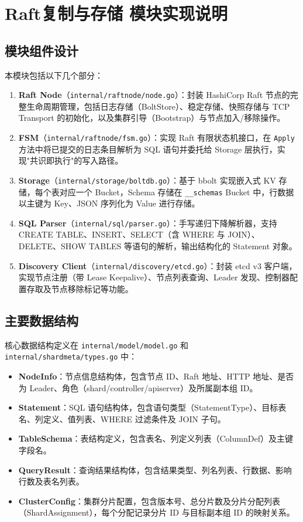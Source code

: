 \documentclass[UTF8,a4paper,12pt]{ctexart}
\newcommand{\moduleA}{Raft复制与存储}
\begin{document}
\section{\moduleA{} 模块实现说明}
\subsection{模块组件设计}
本模块包括以下几个部分：
\begin{enumerate}
  \item \textbf{Raft Node}（\texttt{internal/raftnode/node.go}）：封装 HashiCorp Raft 节点的完整生命周期管理，包括日志存储（BoltStore）、稳定存储、快照存储与 TCP Transport 的初始化，以及集群引导（Bootstrap）与节点加入/移除操作。
  \item \textbf{FSM}（\texttt{internal/raftnode/fsm.go}）：实现 Raft 有限状态机接口，在 \texttt{Apply} 方法中将已提交的日志条目解析为 SQL 语句并委托给 Storage 层执行，实现"共识即执行"的写入路径。
  \item \textbf{Storage}（\texttt{internal/storage/boltdb.go}）：基于 bbolt 实现嵌入式 KV 存储，每个表对应一个 Bucket，Schema 存储在 \texttt{\_\_schemas} Bucket 中，行数据以主键为 Key、JSON 序列化为 Value 进行存储。
  \item \textbf{SQL Parser}（\texttt{internal/sql/parser.go}）：手写递归下降解析器，支持 CREATE TABLE、INSERT、SELECT（含 WHERE 与 JOIN）、DELETE、SHOW TABLES 等语句的解析，输出结构化的 Statement 对象。
  \item \textbf{Discovery Client}（\texttt{internal/discovery/etcd.go}）：封装 etcd v3 客户端，实现节点注册（带 Lease Keepalive）、节点列表查询、Leader 发现、控制器配置存取及节点移除标记等功能。
\end{enumerate}

\subsection{主要数据结构}

核心数据结构定义在 \texttt{internal/model/model.go} 和 \texttt{internal/shardmeta/types.go} 中：

\begin{itemize}
  \item \textbf{NodeInfo}：节点信息结构体，包含节点 ID、Raft 地址、HTTP 地址、是否为 Leader、角色（shard/controller/apiserver）及所属副本组 ID。
  \item \textbf{Statement}：SQL 语句结构体，包含语句类型（StatementType）、目标表名、列定义、值列表、WHERE 过滤条件及 JOIN 子句。
  \item \textbf{TableSchema}：表结构定义，包含表名、列定义列表（ColumnDef）及主键字段名。
  \item \textbf{QueryResult}：查询结果结构体，包含结果类型、列名列表、行数据、影响行数及表名列表。
  \item \textbf{ClusterConfig}：集群分片配置，包含版本号、总分片数及分片分配列表（ShardAssignment），每个分配记录分片 ID 与目标副本组 ID 的映射关系。
\end{itemize}
\end{document}
